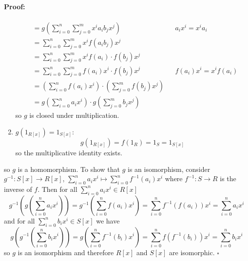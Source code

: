 \documentclass [12pt] {article}
\newenvironment{proof}{\paragraph{Proof:}}{\hfill$\square$}
\begin{document}
\begin{proof}
\begin{enumerate}
\begin{align*}
                &= 
                g \left(\sum^{n}_{i = 0} \sum^{m}_{j = 0} x^i a_i b_j x^j \right)
                && a_i x^i = x^i a_i \\
                &= \sum^{n}_{i = 0} \sum^{m}_{j = 0} x^i f(a_i b_j) x^j \\
                &= \sum^{n}_{i = 0} \sum^{m}_{j = 0} x^i f(a_i) \cdot f(b_j) x^j \\
                &= \sum^{n}_{i = 0} \sum^{m}_{j = 0} f(a_i) x^i \cdot f(b_j) x^j
                && f(a_i) x^i = x^i f(a_i) \\
                &= \left(\sum^{n}_{i = 0} f(a_i) x^i \right) \cdot \left( \sum^{m}_{j = 0} f(b_j) x^j \right) \\
                &= g\left(\sum^{n}_{i = 0} a_i x^i \right) \cdot g \left( \sum^{m}_{j = 0} b_j x^j \right)
            \end{align*}
            so $g$ is closed under multiplication.
        \item $g(1_{R[x]}) = 1_{S[x]}$:
            \[
                g(1_{R[x]}) = f(1_{R}) = 1_{S} = 1_{S[x]}
            \]
            so the multiplicative identity exists.
    \end{enumerate}
    so $g$ is a homomorphism. To show that $g$ is an isomorphism, consider $g^{-1} : S[x] \to R[x]$, 
    $\sum^{n}_{i = 0} a_i x^i \mapsto \sum^{n}_{i = 0} f^{-1}(a_i) x^i$ where 
    $f^{-1} : S \to R$ is the inverse of $f$. Then for all $\sum^{n}_{i = 0} a_i x^i \in R[x]$
    \[
        g^{-1}\left (g\left (\sum^{n}_{i = 0} a_i x^i \right) \right) 
        = g^{-1}\left (\sum^{n}_{i = 0} f\left (a_i \right) x^i \right)
        = \sum^{n}_{i = 0} f^{-1}\left (f\left (a_i \right) \right) x^i
        = \sum^{n}_{i = 0} a_i x^i
    \]
    and for all $\sum^{n}_{i = 0} b_i x^i \in S[x]$ we have
    \[
        g\left( g^{-1}\left( \sum^{n}_{i = 0} b_i x^i \right) \right) 
        = g\left( \sum^{n}_{i = 0} f^{-1}\left( b_i \right) x^i \right)
        = \sum^{n}_{i = 0} f\left( f^{-1}\left( b_i \right) \right) x^i
        = \sum^{n}_{i = 0} b_i x^i
    \]
    so $g$ is an isomorphism and therefore $R[x]$ and $S[x]$ are isomorphic.
\end{proof}

\newpage
\end{document}
